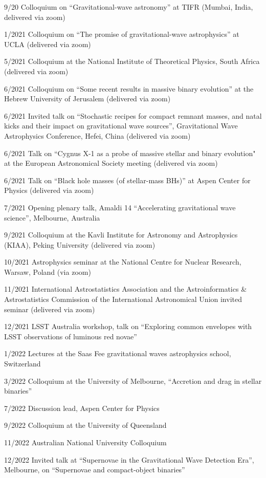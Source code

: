 \documentclass[margin,line]{res}
\begin{document}
\begin{resume}
9/20 Colloquium on  ``Gravitational-wave astronomy'' at TIFR (Mumbai, India, delivered via zoom)

1/2021 Colloquium on ``The promise of gravitational-wave astrophysics'' at UCLA (delivered via zoom)

5/2021 Colloquium at the National Institute of Theoretical Physics, South Africa (delivered via zoom)

6/2021 Colloquium on ``Some recent results in massive binary evolution''  at the Hebrew University of Jerusalem (delivered via zoom)

6/2021 Invited talk on ``Stochastic recipes for compact remnant masses, and natal kicks and their impact on gravitational wave sources'', Gravitational Wave Astrophysics Conference, Hefei, China  (delivered via zoom)

6/2021 Talk on ``Cygnus X-1 as a probe of massive stellar and binary evolution" at the European Astronomical Society meeting (delivered via zoom)

6/2021 Talk on ``Black hole masses (of stellar-mass BHs)'' at Aspen Center for Physics (delivered via zoom)

7/2021 Opening plenary talk, Amaldi 14 ``Accelerating gravitational wave science'', Melbourne, Australia

9/2021 Colloquium at the Kavli Institute for Astronomy and Astrophysics (KIAA), Peking University (delivered via zoom)

10/2021 Astrophysics seminar at the National Centre for Nuclear Research, Warsaw, Poland (via zoom)

11/2021 International Astrostatistics Association and the Astroinformatics \& Astrostatistics Commission of the International Astronomical Union invited seminar (delivered via zoom)

12/2021 LSST Australia workshop, talk on ``Exploring common envelopes with LSST observations of luminous red novae''

1/2022 Lectures at the Saas Fee gravitational waves astrophysics school, Switzerland

3/2022 Colloquium at the University of Melbourne, ``Accretion and drag in stellar binaries'' 

7/2022 Discussion lead, Aspen Center for Physics

9/2022 Colloquium at the University of Queensland

11/2022 Australian National University Colloquium

12/2022	Invited talk at ``Supernovae in the Gravitational Wave Detection Era'', Melbourne, on ``Supernovae and compact-object binaries''



\end{resume}
\end{document}
